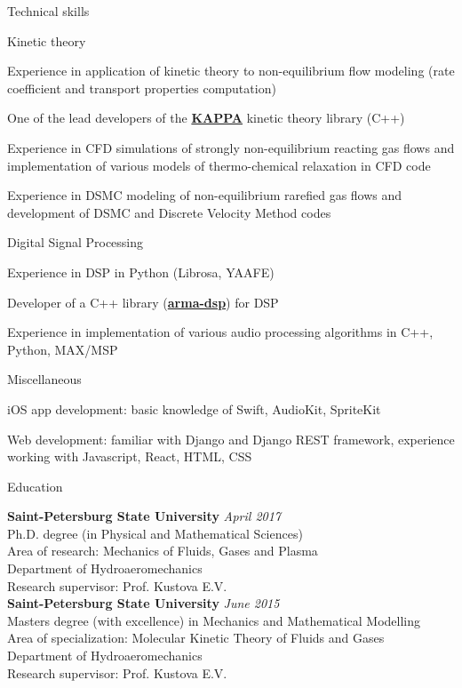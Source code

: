 \documentclass{resume} %
\begin{document}
\begin{rSection}{Technical skills}
\begin{rSubsection}{Kinetic theory}{}{}{}
\item Experience in application of kinetic theory to non-equilibrium flow modeling (rate coefficient and transport properties computation)
\item One of the lead developers of the {\bf \href{https://github.com/lkampoli/kappa}{KAPPA}} kinetic theory library (C++)
\item Experience in CFD simulations of strongly non-equilibrium reacting gas flows and implementation of various models of thermo-chemical relaxation in CFD code
\item Experience in DSMC modeling of non-equilibrium rarefied gas flows and development of DSMC and Discrete Velocity Method codes
\end{rSubsection}

\begin{rSubsection}{Digital Signal Processing}{}{}{}
\item Experience in DSP in Python (Librosa, YAAFE)
\item Developer of a C++ library ({\bf \href{https://github.com/knstmrd/arma-dsp}{arma-dsp}}) for DSP
\item Experience in implementation of various audio processing algorithms in C++, Python, MAX/MSP
\end{rSubsection}

\begin{rSubsection}{Miscellaneous}{}{}{}
\item iOS app development: basic knowledge of Swift, AudioKit, SpriteKit
\item Web development: familiar with Django and Django REST framework, experience working with Javascript, React, HTML, CSS
\end{rSubsection}
\pagebreak
\begin{rSection}{Education}

{\bf Saint-Petersburg State University} \hfill {\em April 2017} \\ 
Ph.D. degree (in Physical and Mathematical Sciences)\\
Area of research: Mechanics of Fluids, Gases and Plasma \\
Department of Hydroaeromechanics \smallskip \\
Research supervisor: Prof. Kustova E.V. \\

{\bf Saint-Petersburg State University} \hfill {\em June 2015} \\ 
Masters degree (with excellence) in Mechanics and Mathematical Modelling\\
Area of specialization: Molecular Kinetic Theory of Fluids and Gases\\
Department of Hydroaeromechanics \smallskip \\
Research supervisor: Prof. Kustova E.V. \\


\end{rSection}
\end{rSection}
\end{document}
